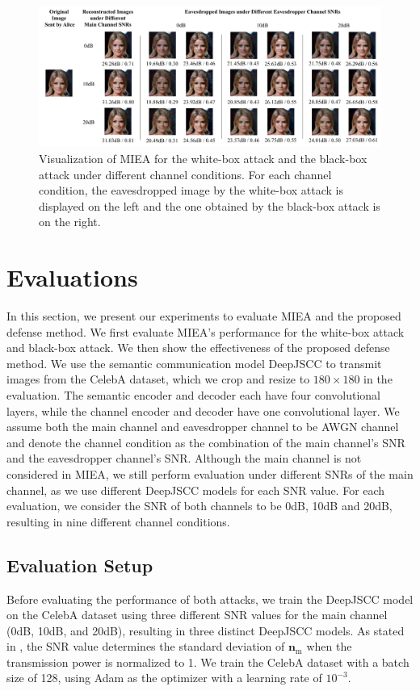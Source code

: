 \documentclass[conference]{IEEEtran}
\begin{document}
\begin{figure}[htbp]
\centering
   \includegraphics[width=5.5in]{figures/miea.pdf}
\caption{Visualization of MIEA for the white-box attack and the black-box attack under different channel conditions. For each channel condition, the eavesdropped image by the white-box attack is displayed on the left and the one obtained by the black-box attack is on the right.}
\label{miea eval fig}
\end{figure}

\section{Evaluations}
\label{sec eval}
In this section, we present our experiments to evaluate MIEA and the proposed defense method. We first evaluate MIEA's performance for the white-box attack and black-box attack. We then show the effectiveness of the proposed defense method. We use the semantic communication model DeepJSCC\cite{bourtsoulatze2019deep} to transmit images from the CelebA dataset\cite{liu2015faceattributes}, which we crop and resize to $180\times180$ in the evaluation. The semantic encoder and decoder each have four convolutional layers, while the channel encoder and decoder have one convolutional layer. We assume both the main channel and eavesdropper channel to be AWGN channel and denote the channel condition as the combination of the main channel's SNR and the eavesdropper channel's SNR. Although the main channel is not considered in MIEA, we still perform evaluation under different SNRs of the main channel, as we use different DeepJSCC models for each SNR value. For each evaluation, we consider the SNR of both channels to be 0dB, 10dB and 20dB, resulting in nine different channel conditions.

\subsection{Evaluation Setup}
Before evaluating the performance of both attacks, we train the DeepJSCC model on the CelebA dataset using three different SNR values for the main channel (0dB, 10dB, and 20dB), resulting in three distinct DeepJSCC models. As stated in \cite{bourtsoulatze2019deep}, the SNR value determines the standard deviation of $\boldsymbol{n}_\mathrm{m}$ when the transmission power is normalized to 1. We train the CelebA dataset with a batch size of 128, using Adam \cite{kingma2014adam} as the optimizer with a learning rate of $10^{-3}$.
\end{document}
